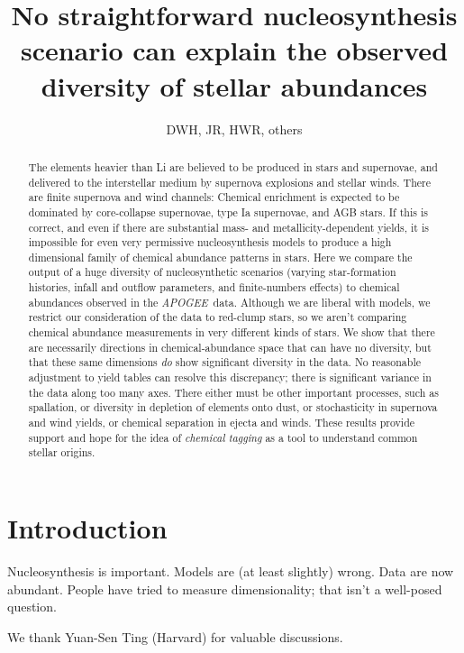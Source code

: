\documentclass[12pt, preprint]{aastex}
\newcommand{\acronym}[1]{{\small{#1}}}
\newcommand{\project}[1]{\textsl{#1}}
\newcommand{\apogee}{\project{\acronym{APOGEE}}}
\begin{document}
\title{No straightforward nucleosynthesis scenario can explain the
  observed diversity of stellar abundances}
\author{DWH, JR, HWR, others}

\begin{abstract}
The elements heavier than Li are believed to be produced in stars and
supernovae, and delivered to the interstellar medium by supernova
explosions and stellar winds.
There are finite supernova and wind channels: Chemical enrichment is
expected to be dominated by core-collapse supernovae, type Ia
supernovae, and AGB stars.
If this is correct, and even if there are substantial mass- and
metallicity-dependent yields, it is impossible for even very
permissive nucleosynthesis models to produce a high dimensional family
of chemical abundance patterns in stars.
Here we compare the output of a huge diversity of nucleosynthetic
scenarios (varying star-formation histories, infall and outflow
parameters, and finite-numbers effects) to chemical abundances
observed in the \apogee\ data.
Although we are liberal with models, we restrict our consideration of
the data to red-clump stars, so we aren't comparing chemical abundance
measurements in very different kinds of stars.
We show that there are necessarily directions in chemical-abundance
space that can have no diversity, but that these same dimensions
\emph{do} show significant diversity in the data.
No reasonable adjustment to yield tables can resolve this discrepancy;
there is significant variance in the data along too many axes.
There either must be other important processes, such as spallation, or
diversity in depletion of elements onto dust, or stochasticity in
supernova and wind yields, or chemical separation in ejecta and winds.
These results provide support and hope for the idea of \emph{chemical
tagging} as a tool to understand common stellar origins.
\end{abstract}


\section{Introduction}

Nucleosynthesis is important.  Models are (at least slightly) wrong.
Data are now abundant. People have tried to measure dimensionality; that
isn't a well-posed question.

\acknowledgements
We thank Yuan-Sen Ting (Harvard) for valuable discussions.
\end{document}
